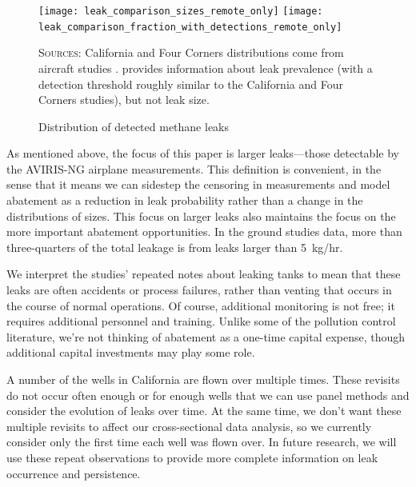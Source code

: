 \documentclass[12pt,oneside,letterpaper]{article}
\theoremstyle{definition}
\begin{document}
\begin{refsection}
\begin{figure}[!bth]
\caption{Distribution of detected methane leaks}
\label{fig:leak-sizes}

\texttt{[image: leak\_comparison\_sizes\_remote\_only]}
\texttt{[image: leak\_comparison\_fraction\_with\_detections\_remote\_only]}

\textsc{Sources:}
California and Four Corners distributions come from aircraft studies \parencite{Duren/etal:2019, Frankenberg/etal:2016}.
\textcite{Lyon/Alvarez/Zavala-Araiza/Brandt/Jackson/Hamburg:2016}
provides information about leak prevalence (with a detection threshold roughly similar to the California and Four Corners studies), but not leak size.
\end{figure}


As mentioned above, the focus of this paper is larger leaks---those detectable by the \gls{AVIRIS-NG} airplane measurements.
This definition is convenient, in the sense that it means we can sidestep the censoring in measurements and model abatement as a reduction in leak probability rather than a change in the distributions of sizes.
This focus on larger leaks also maintains the focus on the more important abatement opportunities.
In the ground studies data, more than three-quarters of the total leakage is from leaks larger than 5~kg/hr.


We interpret the studies' repeated notes about leaking tanks to mean that these leaks are often accidents or process failures, rather than venting that occurs in the course of normal operations.
Of course, additional monitoring is not free; it requires additional personnel and training.
Unlike some of the pollution control literature, we're not thinking of abatement as a one-time capital expense, though additional capital investments may play some role.


A number of the wells in California are flown over multiple times.
These revisits do not occur often enough or for enough wells that we can use panel methods and consider the evolution of leaks over time.
At the same time, we don't want these multiple revisits to affect our cross-sectional data analysis, so we currently consider only the first time each well was flown over.
In future research, we will use these repeat observations to provide more complete information on leak occurrence and persistence.



\end{refsection}
\end{document}
